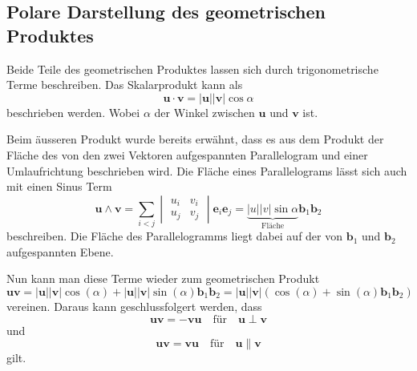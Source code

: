 \subsection{Polare Darstellung des geometrischen Produktes}
Beide Teile des geometrischen Produktes lassen sich durch trigonometrische Terme beschreiben. Das Skalarprodukt kann als 
\begin{equation}
    \textbf{u}\cdot \textbf{v} = |\textbf{u}||\textbf{v}|\cos{\alpha}
\end{equation}
beschrieben werden. Wobei $\alpha$ der Winkel zwischen $\textbf{u}$ und $\textbf{v}$ ist.

Beim äusseren Produkt wurde bereits erwähnt, dass es aus dem Produkt der Fläche des von den zwei Vektoren aufgespannten Parallelogram und einer Umlaufrichtung beschrieben wird. Die Fläche eines Parallelograms lässt sich auch mit einen Sinus Term
\begin{equation}
    \textbf{u} \wedge \textbf{v}
    = 
    \sum_{i<j}
    \begin{vmatrix} 
        u_i & v_i \\
        u_j & v_j
    \end{vmatrix}\textbf{e}_i\textbf{e}_j  
    = 
    \underbrace{|u||v|\sin{\alpha}}_{\text{Fläche}}\textbf{b}_1\textbf{b}_2
\end{equation}
beschreiben.
Die Fläche des Parallelogramms liegt dabei auf der von $\textbf{b}_1$ und $\textbf{b}_2$ aufgespannten Ebene.

Nun kann man diese Terme wieder zum geometrischen Produkt
\begin{equation}
    \textbf{u}\textbf{v}
    = 
    |\textbf{u}||\textbf{v}|\cos{(\alpha)} 
    + 
    |\textbf{u}||\textbf{v}|\sin{(\alpha)} \textbf{b}_1\textbf{b}_2
    = 
    |\textbf{u}||\textbf{v}|(\cos{(\alpha)} + \sin{(\alpha)}\textbf{b}_1\textbf{b}_2)
\end{equation}
vereinen.
Daraus kann geschlussfolgert werden, dass
\begin{equation}
	\textbf{u} \textbf{v}=-\textbf{v}\textbf{u} \quad \textrm{für} \quad \textbf{u}\perp \textbf{v} 
	\label{uperpv}
\end{equation}
und
\begin{equation}
	\textbf{u} \textbf{v}=\textbf{v}\textbf{u} \quad \textrm{für} \quad \textbf{u} \parallel \textbf{v} 
	\label{uparallelv}
\end{equation}
gilt.